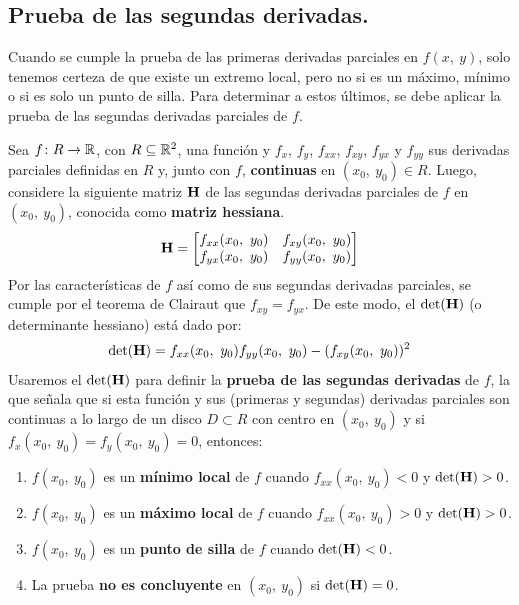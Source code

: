 \documentclass[12pt]{article}
\begin{document}
\subsection{Prueba de las segundas derivadas.}

Cuando se cumple la prueba de las primeras derivadas parciales en $f(x, \ y)$, solo tenemos certeza de que existe un extremo local, pero no si es un máximo, mínimo o si es solo un punto de silla. Para determinar a estos últimos, se debe aplicar la prueba de las segundas derivadas parciales de $f$.

Sea $f\colon R \to \mathbb{R}$, con $R \subseteq \mathbb{R}^{2}$, una función y $f_{x}$, $f_{y}$, $f_{xx}$, $f_{xy}$, $f_{yx}$ y $f_{yy}$ sus derivadas parciales definidas en $R$ y, junto con $f$, \textbf{continuas} en $(x_{0}, \ y_{0}) \in R$. Luego, considere la siguiente matriz $\mathbf{H}$ de las segundas derivadas parciales de $f$ en $(x_{0}, \ y_{0})$, conocida como \textbf{matriz hessiana}.
\[
\mathbf{H} =
\begin{bmatrix}
f_{xx}(x_{0}, \ y_{0}) & f_{xy}(x_{0}, \ y_{0}) \\
f_{yx}(x_{0}, \ y_{0}) & f_{yy}(x_{0}, \ y_{0})
\end{bmatrix}
\]
Por las características de $f$ así como de sus segundas derivadas parciales, se cumple por el teorema de Clairaut que $f_{xy} = f_{yx}$. De este modo, el $\det(\mathbf{H})$ (o determinante hessiano) está dado por:
\[
  \det(\mathbf{H}) = f_{xx}(x_{0}, \ y_{0}) f_{yy}(x_{0}, \ y_{0}) - (f_{xy}(x_{0}, \ y_{0}))^{2}
\]
Usaremos el $\det(\mathbf{H})$ para definir la \textbf{prueba de las segundas derivadas} de $f$, la que señala que si esta función y sus (primeras y segundas) derivadas parciales son continuas a lo largo de un disco $D \subset R$ con centro en $(x_{0}, \ y_{0})$ y si $f_{x}(x_{0}, \ y_{0}) = f_{y}(x_{0}, \ y_{0}) = 0$, entonces:

\begin{enumerate}
\item $f(x_{0}, \ y_{0})$ es un \textbf{mínimo local} de $f$ cuando $f_{xx}(x_{0}, \ y_{0}) < 0$ y $\det(\mathbf{H}) > 0$.
\item $f(x_{0}, \ y_{0})$ es un \textbf{máximo local} de $f$ cuando $f_{xx}(x_{0}, \ y_{0}) > 0$ y $\det(\mathbf{H}) > 0$.
\item $f(x_{0}, \ y_{0})$ es un \textbf{punto de silla} de $f$ cuando $\det(\mathbf{H}) < 0$.
\item La prueba \textbf{no es concluyente} en $(x_{0}, \ y_{0})$ si $\det(\mathbf{H}) = 0$.
\end{enumerate}
\end{document}
